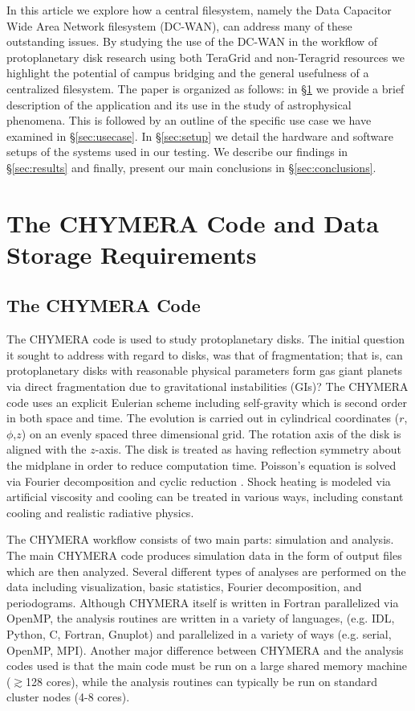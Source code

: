 \documentclass[]{sig-alternate}
\begin{document}
In this article we explore how a central filesystem, namely the Data Capacitor Wide Area Network filesystem (DC-WAN), can address many of these outstanding issues. By studying the use of the DC-WAN in the workflow of protoplanetary disk research using both TeraGrid and non-Teragrid resources we highlight the potential of campus bridging and the general usefulness of a centralized filesystem.
The paper is organized as follows: in \S\ref{sec:chymera} we provide a brief description of the application and its use in the study of astrophysical phenomena. This is followed by an outline of the specific use case we have examined in \S\ref{sec:usecase}. In \S\ref{sec:setup} we detail the hardware and software setups of the systems used in our testing. We describe our findings in \S\ref{sec:results} and finally, present our main conclusions in \S\ref{sec:conclusions}.

\section{The CHYMERA Code and Data Storage Requirements}\label{sec:chymera}
\subsection{The CHYMERA Code}
The CHYMERA code is used to study protoplanetary disks. The initial question it sought to address with regard to disks, was that of fragmentation; that is, can protoplanetary disks with reasonable physical parameters form gas giant planets via direct fragmentation due to gravitational instabilities (GIs)? 
The CHYMERA code uses an explicit Eulerian scheme including self-gravity which is second order in both space and time. The evolution is carried out in cylindrical coordinates ($r$,$\phi$,$z$) on an evenly spaced three dimensional grid. The rotation axis of the disk is aligned with the $z$-axis. The disk is treated as having reflection symmetry about the midplane in order to reduce computation time.
Poisson's equation is solved via Fourier decomposition and cyclic reduction \cite{tohline1980}. Shock heating is modeled via artificial viscosity \cite{pickettphd1995} and cooling can be treated in various ways, including constant cooling and realistic radiative physics.

The CHYMERA workflow consists of two main parts: simulation and analysis. The main CHYMERA code produces simulation data in the form of output files which are then analyzed. Several different types of analyses are performed on the data including visualization, basic statistics, Fourier decomposition, and periodograms. Although CHYMERA itself is written in Fortran parallelized via OpenMP, the analysis routines are written in a variety of languages, (e.g. IDL, Python, C, Fortran, Gnuplot) and parallelized in a variety of ways (e.g. serial, OpenMP, MPI). Another major difference between CHYMERA and the analysis codes used is that the main code must be run on a large shared memory machine ($\gtrsim$128 cores), while the analysis routines can typically be run on standard cluster nodes (4-8 cores). 
\end{document}
